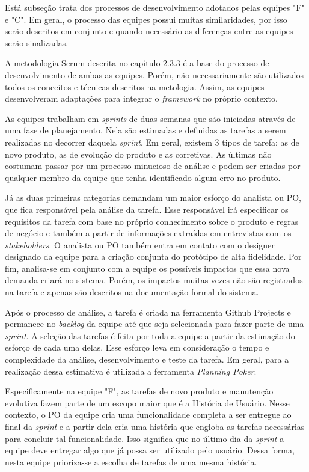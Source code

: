 \documentclass[
    12pt,       %
    openright,      %
    twoside,      %
    a4paper,      %
    english,      %
    french,       %
    spanish,      %
    brazil,       %
    ]{abntex2}
\begin{document}
Está subseção trata dos processos de desenvolvimento adotados pelas equipes "F" e "C". Em geral, o processo das equipes possui muitas similaridades, por isso serão descritos em conjunto e quando necessário as diferenças entre as equipes serão sinalizadas.

A metodologia Scrum descrita no capítulo 2.3.3 é a base do processo de desenvolvimento de ambas as equipes. Porém, não necessariamente são utilizados todos os conceitos e técnicas descritos na metologia. Assim, as equipes desenvolveram adaptações para integrar o \textit{framework} no próprio contexto.

As equipes trabalham em \textit{sprints} de duas semanas que são iniciadas através de uma fase de planejamento. Nela são estimadas e definidas as tarefas a serem realizadas no decorrer daquela \textit{sprint}. Em geral, existem 3 tipos de tarefa: as de novo produto, as de evolução do produto e as corretivas. As últimas não costumam passar por um processo minucioso de análise e podem ser criadas por qualquer membro da equipe que tenha identificado algum erro no produto.

Já as duas primeiras categorias demandam um maior esforço do analista ou PO, que fica responsável pela análise da tarefa. Esse responsável irá especificar os requisitos da tarefa com base no próprio conhecimento sobre o produto e regras de negócio e também a partir de informações extraídas em entrevistas com os \textit{stakeholders}. O analista ou PO também entra em contato com o designer designado da equipe para a criação conjunta do protótipo de alta fidelidade. Por fim, analisa-se em conjunto com a equipe os possíveis impactos que essa nova demanda criará no sistema. Porém, os impactos muitas vezes não são registrados na tarefa e apenas são descritos na documentação formal do sistema.

Após o processo de análise, a tarefa é criada na ferramenta Github Projects e permanece no \textit{backlog} da equipe até que seja selecionada para fazer parte de uma \textit{sprint}. A seleção das tarefas é feita por toda a equipe a partir da estimação do esforço de cada uma delas. Esse esforço leva em consideração o tempo e complexidade da análise, desenvolvimento e teste da tarefa. Em geral, para a realização dessa estimativa é utilizada a ferramenta \textit{Planning Poker}.

Especificamente na equipe "F", as tarefas de novo produto e manutenção evolutiva fazem parte de um escopo maior que é a História de Usuário. Nesse contexto, o PO da equipe cria uma funcionalidade completa a ser entregue ao final da \textit{sprint} e a partir dela cria uma história que engloba as tarefas necessárias para concluir tal funcionalidade. Isso significa que no último dia da \textit{sprint} a equipe deve entregar algo que já possa ser utilizado pelo usuário. Dessa forma, nesta equipe prioriza-se a escolha de tarefas de uma mesma história. 
\end{document}
